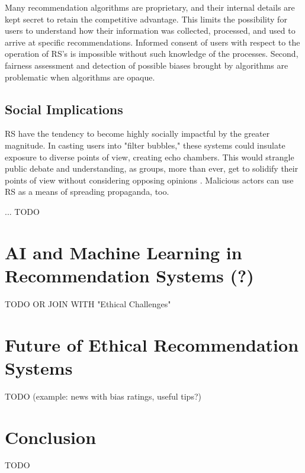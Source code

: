 \documentclass{article}
\begin{document}
Many recommendation algorithms are proprietary, and their internal details are kept secret to retain the competitive advantage. This limits the possibility for users to understand how their information was collected, processed, and used to arrive at specific recommendations. Informed consent of users with respect to the operation of RS's is impossible without such knowledge of the processes. Second, fairness assessment and detection of possible biases brought by algorithms are problematic when algorithms are opaque.\cite{IaAEC_in_RS}


\subsection{Social Implications}

RS have the tendency to become highly socially impactful by the greater magnitude. In casting users into "filter bubbles," these systems could insulate exposure to diverse points of view, creating echo chambers. This would strangle public debate and understanding, as groups, more than ever, get to solidify their points of view without considering opposing opinions \cite{FB}. Malicious actors can use RS as a means of spreading propaganda, too.

... TODO

\section{AI and Machine Learning in Recommendation Systems (?)}
TODO OR JOIN WITH "Ethical Challenges" 
\section{Future of Ethical Recommendation Systems}
TODO (example: news with bias ratings, useful tips?)
\section{Conclusion}
TODO


\end{document}
